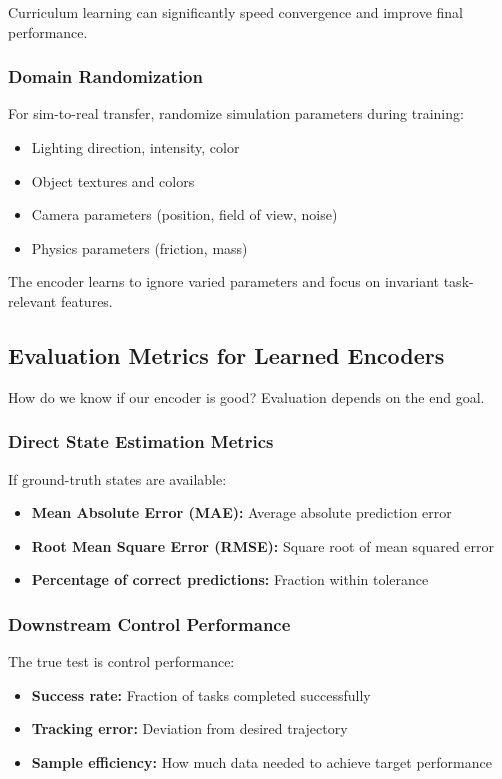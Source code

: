 Curriculum learning can significantly speed convergence and improve final performance.

\subsubsection{Domain Randomization}

For sim-to-real transfer, randomize simulation parameters during training:
\begin{itemize}
    \item Lighting direction, intensity, color
    \item Object textures and colors
    \item Camera parameters (position, field of view, noise)
    \item Physics parameters (friction, mass)
\end{itemize}

The encoder learns to ignore varied parameters and focus on invariant task-relevant features.

\subsection{Evaluation Metrics for Learned Encoders}

How do we know if our encoder is good? Evaluation depends on the end goal.

\subsubsection{Direct State Estimation Metrics}

If ground-truth states are available:
\begin{itemize}
    \item \textbf{Mean Absolute Error (MAE):} Average absolute prediction error
    \item \textbf{Root Mean Square Error (RMSE):} Square root of mean squared error
    \item \textbf{Percentage of correct predictions:} Fraction within tolerance
\end{itemize}

\subsubsection{Downstream Control Performance}

The true test is control performance:
\begin{itemize}
    \item \textbf{Success rate:} Fraction of tasks completed successfully
    \item \textbf{Tracking error:} Deviation from desired trajectory
    \item \textbf{Sample efficiency:} How much data needed to achieve target performance
\end{itemize}

